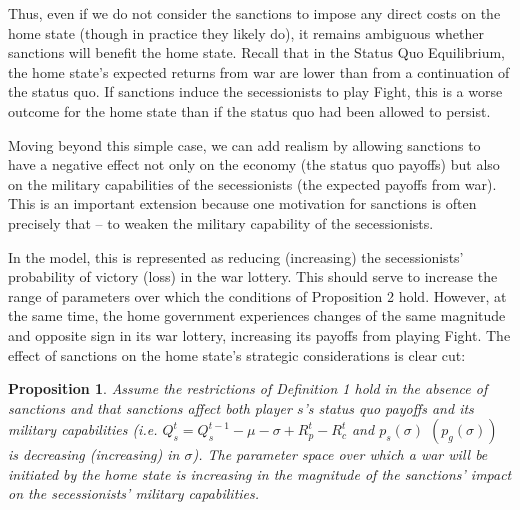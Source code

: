 \documentclass[11pt,letterpaper, notitlepage]{article}
\newtheorem{proposition}{Proposition}
\begin{document}
Thus, even if we do not consider the sanctions to impose any direct costs on the home state (though in practice they likely do), it remains ambiguous whether sanctions will benefit the home state. Recall that in the Status Quo Equilibrium, the home state's expected returns from war are lower than from a continuation of the status quo. If sanctions induce the secessionists to play Fight, this is a worse outcome for the home state than if the status quo had been allowed to persist.  


Moving beyond this simple case, we can add realism by allowing sanctions to have a negative effect not only on the economy (the status quo payoffs) but also on the military capabilities of the secessionists (the expected payoffs from war). This is an important extension because one motivation for sanctions is often precisely that -- to weaken the military capability of the secessionists. 

In the model, this is represented as reducing (increasing) the secessionists' probability of victory (loss) in the war lottery. This should serve to increase the range of parameters over which the conditions of Proposition 2 hold. However, at the same time, the home government experiences changes of the same magnitude and opposite sign in its war lottery, increasing its payoffs from playing Fight. The effect of sanctions on the home state's strategic considerations is clear cut:

\begin{proposition}
Assume the restrictions of \emph{Definition 1} hold in the absence of sanctions and that sanctions affect both player $s$'s status quo payoffs and its military capabilities (i.e. $Q_s^t = Q_s^{t-1} - \mu -\sigma +R_p^t - R_c^t$ \emph{and} $p_s\left(\sigma\right)$ $\left(p_g\left(\sigma\right)\right)$ is decreasing (increasing) in $\sigma$). The parameter space over which a war will be initiated by the home state is increasing in the magnitude of the sanctions' impact on the secessionists' military capabilities.
\end{proposition}
\end{document}
